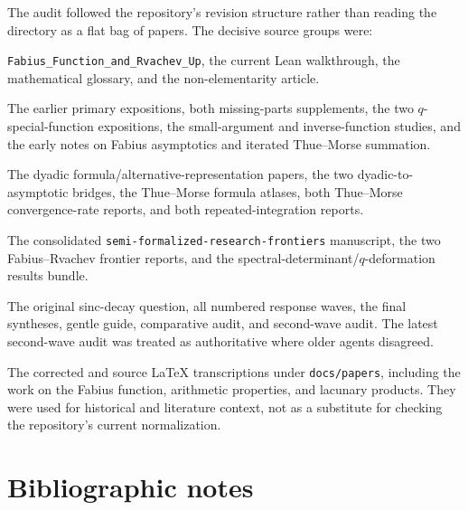 \documentclass[11pt]{article}
\numberwithin{equation}{section}
\theoremstyle{definition}
\theoremstyle{remark}
\begin{document}
The audit followed the repository's revision structure rather than reading the
directory as a flat bag of papers.  The decisive source groups were:
\begin{description}[style=nextline,leftmargin=2.2em,labelindent=0pt]
\item[Current expository core.]
\texttt{Fabius\_Function\_and\_Rvachev\_Up}, the current Lean walkthrough,
the mathematical glossary, and the non-elementarity article.

\item[Archived foundational studies.]
The earlier primary expositions, both missing-parts supplements, the two
$q$-special-function expositions, the small-argument and inverse-function
studies, and the early notes on Fabius asymptotics and iterated Thue--Morse
summation.

\item[Exact arithmetic and convergence studies.]
The dyadic formula/alternative-representation papers, the two
dyadic-to-asymptotic bridges, the Thue--Morse formula atlases, both
Thue--Morse convergence-rate reports, and both repeated-integration reports.

\item[Live frontier synthesis.]
The consolidated \texttt{semi-formalized-research-frontiers} manuscript, the two
Fabius--Rvachev frontier reports, and the spectral-determinant/$q$-deformation
results bundle.

\item[Fourier-decay campaign.]
The original sinc-decay question, all numbered response waves, the final
syntheses, gentle guide, comparative audit, and second-wave audit.  The latest
second-wave audit was treated as authoritative where older agents disagreed.

\item[Reference transcriptions.]
The corrected and source \LaTeX{} transcriptions under \texttt{docs/papers},
including the work on the Fabius function, arithmetic properties, and lacunary
products.  They were used for historical and literature context, not as a
substitute for checking the repository's current normalization.
\end{description}

\section{Bibliographic notes}
\end{document}
